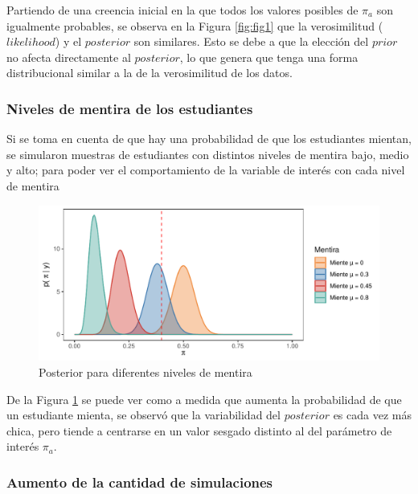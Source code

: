 \documentclass[
]{article}
\begin{document}
Partiendo de una creencia inicial en la que todos los valores posibles de \(\pi_a\) son igualmente probables, se observa en la Figura \ref{fig:fig1} que la verosimilitud (\(likelihood\)) y el \(posterior\) son similares. Esto se debe a que la elección del \(prior\) no afecta directamente al \(posterior\), lo que genera que tenga una forma distribucional similar a la de la verosimilitud de los datos.

\subsubsection{Niveles de mentira de los estudiantes}\label{subtitulo-2}

Si se toma en cuenta de que hay una probabilidad de que los estudiantes
mientan, se simularon muestras de estudiantes con distintos niveles de
mentira bajo, medio y alto; para poder ver el comportamiento de la
variable de interés con cada nivel de mentira

\FloatBarrier

\begin{figure}

{\centering \includegraphics{TP-1--Bayes_files/figure-latex/fig2-1} 

}

\caption{Posterior para diferentes niveles de mentira}\label{fig:fig2}
\end{figure}

De la Figura \ref{fig:fig2} se puede ver como a medida que aumenta la probabilidad de que un estudiante mienta, se observó que la variabilidad del \(posterior\) es cada vez más chica, pero tiende a centrarse en un valor sesgado distinto al del parámetro de interés \(\pi_a\).

\newpage

\subsubsection{Aumento de la cantidad de simulaciones}\label{subtitulo-3}
\end{document}
